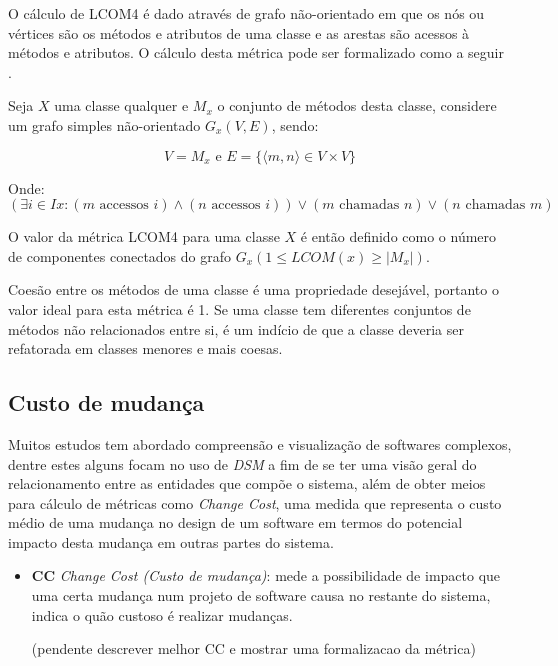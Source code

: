 \begin{itemize}
O cálculo de LCOM4 é dado através de grafo não-orientado em que os nós ou
vértices são os métodos e atributos de uma classe e as arestas são acessos à
métodos e atributos. O cálculo desta métrica pode ser formalizado como a
seguir \cite{Silva2012}.

Seja $ X $ uma classe qualquer e $ M_x $ o conjunto de métodos desta classe,
considere um grafo simples não-orientado $ G_x(V, E) $, sendo:

\begin{equation}
V = M_x
\text{ e }
E = \{ \langle m, n \rangle \in V \times V \}
\end{equation}

Onde:
\begin{equation}
(\exists i \in Ix : (m \text{ accessos } i) \land (n \text{ accessos } i)) \lor (m \text{ chamadas } n) \lor (n \text{ chamadas } m)
\end{equation}

O valor da métrica LCOM4 para uma classe $ X $ é então definido como o número
de componentes conectados do grafo $ G_x (1 \leq LCOM(x) \geq | M_x |)$.

Coesão entre os métodos de uma classe é uma propriedade desejável, portanto o
valor ideal para esta métrica é 1. Se uma classe tem diferentes conjuntos de
métodos não relacionados entre si, é um indício de que a classe deveria ser
refatorada em classes menores e mais coesas.

\end{itemize}

\subsection{Custo de mudança} \label{custo-mudanca}

Muitos estudos tem abordado compreensão e visualização de softwares complexos,
dentre estes alguns focam no uso de {\it DSM} a fim de se ter uma visão geral
do relacionamento entre as entidades que compõe o sistema, além de obter meios
para cálculo de métricas como {\it Change Cost}, uma medida que representa o
custo médio de uma mudança no design de um software em termos do potencial
impacto desta mudança em outras partes do sistema.

\begin{itemize}

  \item {\bf CC} {\it Change Cost (Custo de mudança)}: mede a possibilidade de
    impacto que uma certa mudança num projeto de software causa no restante do
    sistema\cite{Maccormack2006}, indica o quão custoso é realizar mudanças.

(pendente descrever melhor CC e mostrar uma formalizacao da métrica)

\end{itemize}


